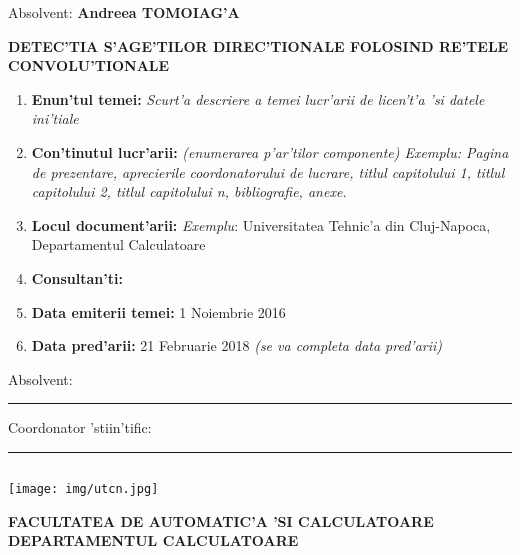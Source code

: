 \documentclass[12pt,a4paper,twoside]{report}
\renewcommand{\thesisauthor}{Andreea TOMOIAG'A}    %
\renewcommand{\thesistitle}{DETEC'TIA S'AGE'TILOR DIREC'TIONALE FOLOSIND RE'TELE CONVOLU'TIONALE} %
\newcommand{\department}{FACULTATEA DE AUTOMATIC'A 'SI CALCULATOARE\\
DEPARTAMENTUL CALCULATOARE}
\newcommand{\uline}[1]{\rule[0pt]{#1}{0.4pt}}
\newcommand{\utcnlogo}{\texttt{[image: img/utcn.jpg]}}
\begin{document}
\vspace{2cm}

\begin{center}
Absolvent: {\bf \thesisauthor}

\vspace{1cm}

{\bf \thesistitle}
\end{center}

\vspace{1cm}

\begin{enumerate}
 \item {\bf Enun'tul temei:} {\it Scurt'a descriere a temei lucr'arii de licen't'a 'si datele ini'tiale}
\item {\bf Con'tinutul lucr'arii:} {\it (enumerarea p'ar'tilor componente) Exemplu: Pagina de prezentare, aprecierile coordonatorului de lucrare, titlul capitolului 1, titlul capitolului 2, titlul capitolului n, bibliografie, anexe.}
\item {\bf Locul document'arii:} {\it Exemplu}: Universitatea Tehnic'a din Cluj-Napoca, Departamentul Calculatoare
\item {\bf Consultan'ti:}
\item {\bf Data emiterii temei:} 1 Noiembrie 2016
\item {\bf Data pred'arii:} 21 Februarie 2018 {\it (se va completa data pred'arii)}
  \end{enumerate}
\vspace{1.2cm}

\hspace{6cm} Absolvent: \uline{6cm} 

\vspace{0.5cm}
\hspace{6cm} Coordonator 'stiin'tific: \uline{5cm} 

\thispagestyle{empty}


$ $


\thispagestyle{empty}
\newpage

\begin{center}
\utcnlogo

{\bf \department}
\end{center}

\vspace{0.5cm}
\end{document}
